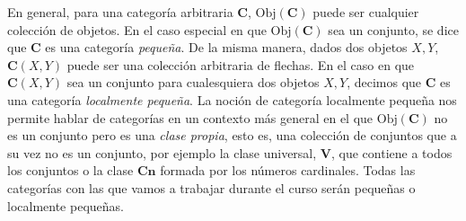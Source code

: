 \documentclass[12pt,a4paper]{book}
\theoremstyle{definition} \newtheorem{defn}[thm]{Definición}
\theoremstyle{definition} \newtheorem{ejemplo}[thm]{Ejemplo}
\theoremstyle{definition} \newtheorem{ejercicio}[thm]{Ejercicio}
\theoremstyle{remark} \newtheorem*{obs}{Observación}
\def\obj{\mathrm{Obj}}
\def\cat{\mathbf{C}}
\begin{document}
En general, para una categoría arbitraria $\cat$, $\obj(\cat)$ puede ser cualquier colección de objetos. En el caso especial en que $\obj(\cat)$ sea un conjunto, se dice que $\cat$ es una categoría \emph{pequeña}. De la misma manera, dados dos objetos $X,Y$, $\cat(X,Y)$ puede ser una colección arbitraria de flechas. En el caso en que $\cat(X,Y)$ sea un conjunto para cualesquiera dos objetos $X,Y$, decimos que $\cat$ es una categoría \emph{localmente pequeña}. La noción de categoría localmente pequeña nos permite hablar de categorías en un contexto más general en el que $\obj(\cat)$ no es un conjunto pero es una \emph{clase propia}, esto es, una colección de conjuntos que a su vez no es un conjunto, por ejemplo la clase universal, $\mathbf{V}$, que contiene a todos los conjuntos o la clase $\mathbf{Cn}$ formada por los números cardinales. Todas las categorías con las que vamos a trabajar durante el curso serán pequeñas o localmente pequeñas. 
\end{document}
